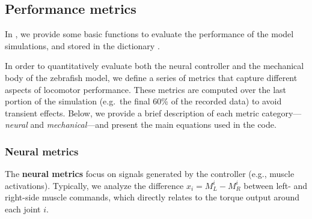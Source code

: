 \documentclass{cmc}
\begin{document}
\subsection*{Performance metrics}\label{sec:performance-metrics}

In , we provide some basic functions to evaluate the performance
of the model simulations, and stored in the dictionary .

In order to quantitatively evaluate both the neural controller and the mechanical body of the zebrafish model, we define a series of metrics that capture different aspects of locomotor performance. These metrics are computed over the last portion of the simulation (e.g.\ the final 60\% of the recorded data) to avoid transient effects. Below, we provide a brief description of each metric category—\emph{neural} and \emph{mechanical}—and present the main equations used in the code.

\subsubsection*{Neural metrics}

The \textbf{neural metrics} focus on signals generated by the controller (e.g., muscle activations). Typically, we analyze the difference $x_i = M^i_{L} - M^i_{R}$ between left- and right-side muscle commands, which directly relates to the torque output around each joint $i$.
\end{document}
